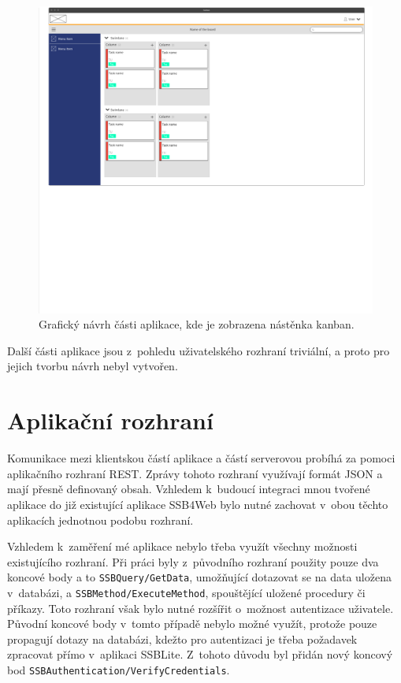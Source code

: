 \begin{figure}[H]
	\centering
	\label{img:design-kanban}
	\includegraphics[width=\textwidth]{obrazky-figures/ui-design.pdf}
	\caption{Grafický návrh části aplikace, kde je zobrazena nástěnka kanban.}
\end{figure}

Další části aplikace jsou z~pohledu uživatelského rozhraní triviální, a proto pro jejich tvorbu návrh nebyl vytvořen.


\section{Aplikační rozhraní}\label{sec:api}
Komunikace mezi klientskou částí aplikace a částí serverovou probíhá za pomoci aplikačního rozhraní REST. Zprávy tohoto rozhraní využívají formát JSON a mají přesně definovaný obsah.
Vzhledem k~budoucí integraci mnou tvořené aplikace do již existující aplikace SSB4Web bylo nutné zachovat v~obou těchto aplikacích jednotnou podobu rozhraní.

Vzhledem k~zaměření mé aplikace nebylo třeba využít všechny možnosti existujícího rozhraní. Při práci byly z~původního rozhraní použity pouze dva koncové body a to \texttt{SSBQuery/GetData}, umožňující dotazovat se na data uložena v~databázi, a \sloppy\texttt{SSBMethod/ExecuteMethod}, spouštějící uložené procedury či příkazy. Toto rozhraní však bylo nutné rozšířit o~možnost autentizace uživatele. Původní koncové body v~tomto případě nebylo možné využít, protože pouze propagují dotazy na databázi, kdežto pro autentizaci je třeba požadavek zpracovat přímo v~aplikaci SSBLite. Z~tohoto důvodu byl přidán nový koncový bod \sloppy\texttt{SSBAuthentication/VerifyCredentials}.


